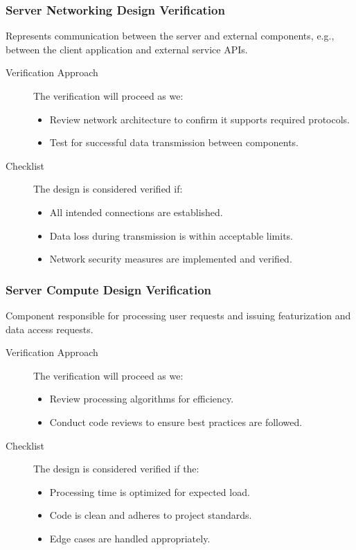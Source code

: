 \documentclass[12pt, titlepage]{article}
\begin{document}
\subsubsection{Server Networking Design Verification}
Represents communication between the server and external components, e.g., between the client application and external service APIs.
\begin{description}
  \item[Verification Approach] The verification will proceed as we:
  \begin{itemize}[leftmargin=0cm]
    \item Review network architecture to confirm it supports required protocols.
    \item Test for successful data transmission between components.
  \end{itemize}
  \item[Checklist] The design is considered verified if:
    \begin{itemize}[label=$\square$,leftmargin=0cm]
    \item All intended connections are established.
    \item Data loss during transmission is within acceptable limits.
    \item Network security measures are implemented and verified.
  \end{itemize}
\end{description}

\subsubsection{Server Compute Design Verification}
Component responsible for processing user requests and issuing featurization and data access requests.
\begin{description}
  \item[Verification Approach] The verification will proceed as we:
  \begin{itemize}[leftmargin=0cm]
    \item Review processing algorithms for efficiency.
    \item Conduct code reviews to ensure best practices are followed.
  \end{itemize}
  \item[Checklist] The design is considered verified if the:
    \begin{itemize}[label=$\square$,leftmargin=0cm]
    \item Processing time is optimized for expected load.
    \item Code is clean and adheres to project standards.
    \item Edge cases are handled appropriately.
  \end{itemize}
\end{description}
\end{document}

